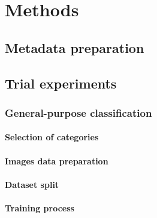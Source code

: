 \chapter{Methods}
\label{chap:methods}

\section{Metadata preparation}
\section{Trial experiments}
    \subsection{General-purpose classification}
    \subsubsection{Selection of categories}
    \subsubsection{Images data preparation}
    \subsubsection{Dataset split}
    \subsubsection{Training process}
    
    
    
